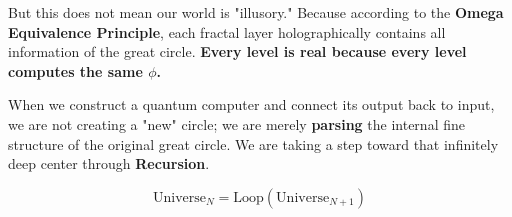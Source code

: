 But this does not mean our world is "illusory." Because according to the \textbf{Omega Equivalence Principle}, each fractal layer holographically contains all information of the great circle.
\textbf{Every level is real because every level computes the same $\phi$.}

When we construct a quantum computer and connect its output back to input, we are not creating a "new" circle; we are merely \textbf{parsing} the internal fine structure of the original great circle. We are taking a step toward that infinitely deep center through \textbf{Recursion}.

\[\text{Universe}_{N} = \text{Loop} \left( \text{Universe}_{N+1} \right)\]

